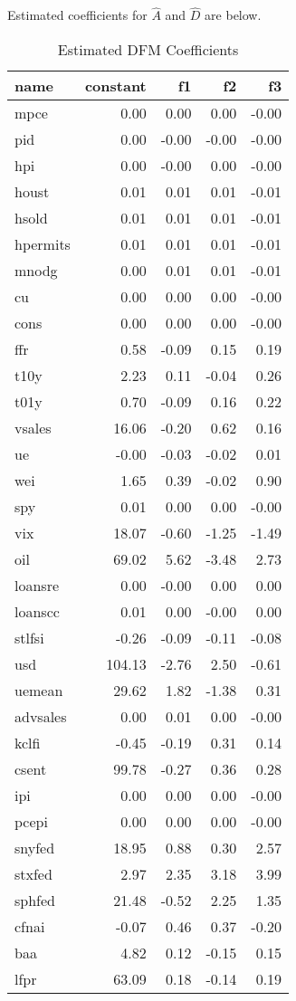 \documentclass[11pt, letterpaper]{article}\usepackage[]{graphicx}\usepackage[]{color}
\begin{document}
Estimated coefficients for $\widehat{A}$ and $\widehat{D}$ are below.
\begin{table}[H]
\centering
\begingroup\footnotesize
\begin{tabular}{lrrrr}
  \hline
name & constant & f1 & f2 & f3 \\ 
  \hline
mpce & 0.00 & 0.00 & 0.00 & -0.00 \\ 
  pid & 0.00 & -0.00 & -0.00 & -0.00 \\ 
  hpi & 0.00 & -0.00 & 0.00 & -0.00 \\ 
  houst & 0.01 & 0.01 & 0.01 & -0.01 \\ 
  hsold & 0.01 & 0.01 & 0.01 & -0.01 \\ 
  hpermits & 0.01 & 0.01 & 0.01 & -0.01 \\ 
  mnodg & 0.00 & 0.01 & 0.01 & -0.01 \\ 
  cu & 0.00 & 0.00 & 0.00 & -0.00 \\ 
  cons & 0.00 & 0.00 & 0.00 & -0.00 \\ 
  ffr & 0.58 & -0.09 & 0.15 & 0.19 \\ 
  t10y & 2.23 & 0.11 & -0.04 & 0.26 \\ 
  t01y & 0.70 & -0.09 & 0.16 & 0.22 \\ 
  vsales & 16.06 & -0.20 & 0.62 & 0.16 \\ 
  ue & -0.00 & -0.03 & -0.02 & 0.01 \\ 
  wei & 1.65 & 0.39 & -0.02 & 0.90 \\ 
  spy & 0.01 & 0.00 & 0.00 & -0.00 \\ 
  vix & 18.07 & -0.60 & -1.25 & -1.49 \\ 
  oil & 69.02 & 5.62 & -3.48 & 2.73 \\ 
  loansre & 0.00 & -0.00 & 0.00 & 0.00 \\ 
  loanscc & 0.01 & 0.00 & -0.00 & 0.00 \\ 
  stlfsi & -0.26 & -0.09 & -0.11 & -0.08 \\ 
  usd & 104.13 & -2.76 & 2.50 & -0.61 \\ 
  uemean & 29.62 & 1.82 & -1.38 & 0.31 \\ 
  advsales & 0.00 & 0.01 & 0.00 & -0.00 \\ 
  kclfi & -0.45 & -0.19 & 0.31 & 0.14 \\ 
  csent & 99.78 & -0.27 & 0.36 & 0.28 \\ 
  ipi & 0.00 & 0.00 & 0.00 & -0.00 \\ 
  pcepi & 0.00 & 0.00 & 0.00 & -0.00 \\ 
  snyfed & 18.95 & 0.88 & 0.30 & 2.57 \\ 
  stxfed & 2.97 & 2.35 & 3.18 & 3.99 \\ 
  sphfed & 21.48 & -0.52 & 2.25 & 1.35 \\ 
  cfnai & -0.07 & 0.46 & 0.37 & -0.20 \\ 
  baa & 4.82 & 0.12 & -0.15 & 0.15 \\ 
  lfpr & 63.09 & 0.18 & -0.14 & 0.19 \\ 
   \hline
\end{tabular}
\endgroup
\caption{Estimated DFM Coefficients} 
\end{table}
\end{document}
